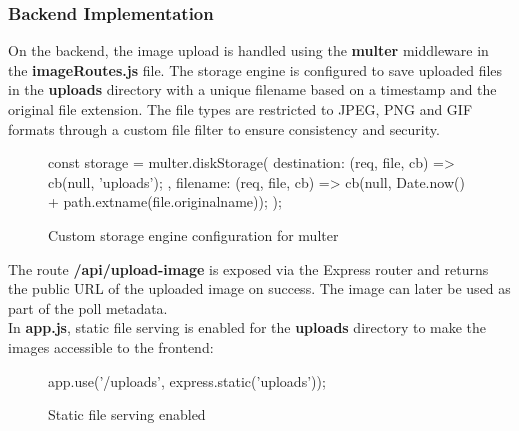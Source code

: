 \documentclass[a4paper,12pt]{report}
\begin{document}
\subsubsection{Backend Implementation}
On the backend, the image upload is handled using the \textbf{multer} middleware in the \textbf{imageRoutes.js} file. The storage engine is configured to save uploaded files in the \textbf{uploads} directory with a unique filename based on a timestamp and the original file extension. The file types are restricted to JPEG, PNG and GIF formats through a custom file filter to ensure consistency and security.\parencite{expressmulter}
\begin{figure}[H]
	\begin{code}
		const storage = multer.diskStorage({
			destination: (req, file, cb) => {
				cb(null, 'uploads');
			},
			filename: (req, file, cb) => {
				cb(null, Date.now() + path.extname(file.originalname));
			}
		});
	\end{code}
	\caption{Custom storage engine configuration for multer}
	\label{fig:multer_config}
\end{figure}
\noindent
The route \textbf{/api/upload-image} is exposed via the Express router and returns the public URL of the uploaded image on success. The image can later be used as part of the poll metadata.\\
In \textbf{app.js}, static file serving is enabled for the \textbf{uploads} directory to make the images accessible to the frontend:
\begin{figure}[H]
	\begin{code}
		app.use('/uploads', express.static('uploads'));
	\end{code}
	\caption{Static file serving enabled}
	\label{fig:static_file_serving}
\end{figure}
\end{document}
